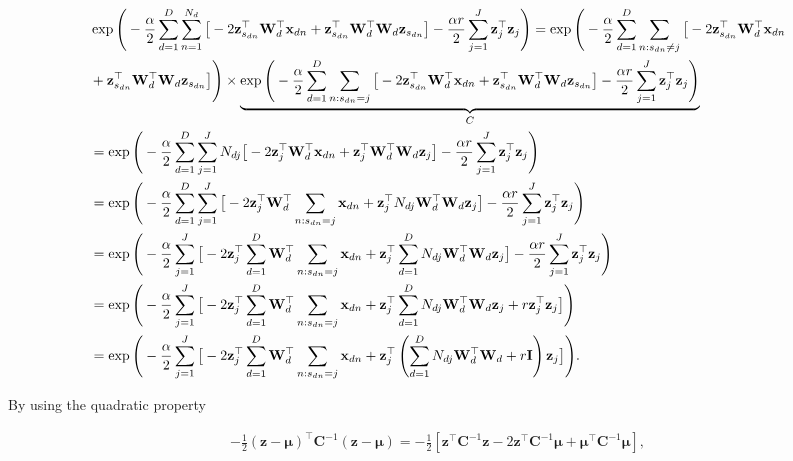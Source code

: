 \documentclass[]{article}
\newcommand{\eye}{\mathbf{I}}
\newcommand{\indobj}{\mathbf{x}_{dn}}
\newcommand{\projMatI}{\mathbf{W}_d}
\newcommand{\lvecI}{\mathbf{z}_j}
\newcommand{\lvecsI}{\mathbf{z}_{s_{dn}}}
\begin{document}
\begin{align}
&\exp\Bigg(-\frac{\alpha}{2} \sum_{d=1}^{D}\sum_{n=1}^{N_d}\big[ -2 \lvecsI ^\top \projMatI^\top \indobj+\lvecsI^\top \projMatI^\top \projMatI \lvecsI \big] -\frac{\alpha r}{2} \sum_{j=1}^{J}\lvecI^\top\lvecI \Bigg) = \exp\Bigg(-\frac{\alpha}{2} \sum_{d=1}^{D}\sum_{n:s_{dn}\ne j}\big[  -2 \lvecsI ^\top \projMatI^\top \indobj\notag\\
&+ \lvecsI^\top \projMatI^\top \projMatI \lvecsI \big] \Bigg)\times \underbrace{\exp\Bigg(-\frac{\alpha}{2} \sum_{d=1}^{D}\sum_{n:s_{dn}=j}\big[ -2 \lvecsI ^\top \projMatI^\top \indobj+\lvecsI^\top \projMatI^\top \projMatI \lvecsI \big]-\frac{\alpha r}{2} \sum_{j=1}^{J}\lvecI^\top\lvecI\Bigg)}_{C} \notag\\
&=\exp\Bigg(-\frac{\alpha}{2} \sum_{d=1}^{D}\sum_{j=1}^J N_{dj}\big[ -2 \lvecI ^\top \projMatI^\top \indobj+\lvecI^\top \projMatI^\top \projMatI \lvecI \big]-\frac{\alpha r}{2} \sum_{j=1}^{J}\lvecI^\top\lvecI\Bigg) \notag\\
&=\exp\Bigg(-\frac{\alpha}{2} \sum_{d=1}^{D}\sum_{j=1}^J \big[ -2 \lvecI ^\top \projMatI^\top \sum_{n:s_{dn}=j}\indobj+\lvecI^\top N_{dj}\projMatI^\top \projMatI \lvecI \big]-\frac{\alpha r}{2} \sum_{j=1}^{J}\lvecI^\top\lvecI\Bigg) \notag \\
&=\exp\Bigg(-\frac{\alpha}{2}\sum_{j=1}^J \big[ -2 \lvecI ^\top  \sum_{d=1}^{D}\projMatI^\top \sum_{n:s_{dn}=j}\indobj+\lvecI^\top  \sum_{d=1}^{D} N_{dj}\projMatI^\top \projMatI \lvecI \big]-\frac{\alpha r}{2} \sum_{j=1}^{J}\lvecI^\top\lvecI\Bigg) \notag \\
&= \exp\Bigg(-\frac{\alpha}{2}\sum_{j=1}^J \big[ -2 \lvecI ^\top  \sum_{d=1}^{D}\projMatI^\top \sum_{n:s_{dn}=j}\indobj+\lvecI^\top  \sum_{d=1}^{D} N_{dj}\projMatI^\top \projMatI \lvecI + r\lvecI^\top\lvecI\big]\Bigg) \notag \\
&= \exp\Bigg(-\frac{\alpha}{2}\sum_{j=1}^J \big[ -2 \lvecI ^\top  \sum_{d=1}^{D}\projMatI^\top \sum_{n:s_{dn}=j}\indobj+\lvecI^\top  \left(\sum_{d=1}^{D} N_{dj}\projMatI^\top \projMatI + r\eye\right) \lvecI \big]\Bigg).
 \label{eq:llExp1lin}
\end{align}

By using the quadratic property

\begin{align}
-\frac{1}{2}\left(\mathbf{z}-\boldsymbol{\mu}\right)^\top \boldsymbol{C}^{-1} \left(\mathbf{z}-\boldsymbol{\mu}\right) = -\frac{1}{2}\left[\mathbf{z}^\top \boldsymbol{C}^{-1}\mathbf{z} -2\mathbf{z}^\top \boldsymbol{C}^{-1}\boldsymbol{\mu} + \boldsymbol{\mu}^\top\boldsymbol{C}^{-1}\boldsymbol{\mu}\right] \label{eq:quadlin},
\end{align}
\end{document}
